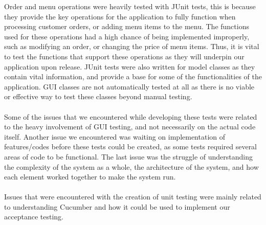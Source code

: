Order and menu operations were heavily tested with JUnit tests, this is because they provide the key operations for the application to fully function when processing customer orders, or adding menu items to the menu. The functions used for these operations had a high chance of being implemented improperly, such as modifying an order, or changing the price of menu items. Thus, it is vital to test the functions that support these operations as they will underpin our application upon release. JUnit tests were also written for model classes as they contain vital information, and provide a base for some of the functionalities of the application. GUI classes are not automatically tested at all as there is no viable or effective way to test these classes beyond manual testing. \\ \\
Some of the issues that we encountered while developing these tests were related to the heavy involvement of GUI testing, and not necessarily on the actual code itself. Another issue we encountered was waiting on implementation of features/codes before these tests could be created, as some tests required several areas of code to be functional. The last issue was the struggle of understanding the complexity of the system as a whole, the architecture of the system, and how each element worked together to make the system run. \\ \\ Issues that were encountered with the creation of unit testing were mainly related to understanding Cucumber and how it could be used to implement our acceptance testing. \\

